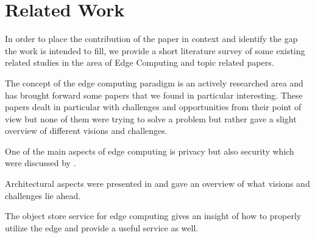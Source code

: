 \section{Related Work}\label{sec:relatedwork}

In order to place the contribution of the paper in context and identify the gap the work is intended to fill, we provide a short literature survey of some existing related studies in the area of Edge Computing and topic related papers.

The concept of the edge computing paradigm is an actively researched area and has brought forward some papers that we found in particular interesting.
These papers dealt in particular with challenges and opportunities from their point of view \cite{7488250}\cite{GarciaLopez:2015:ECV:2831347.2831354}\cite{7796149}\cite{7474412}\cite{AHMED201759} but none of them were trying to solve a problem but rather gave a slight overview of different visions and challenges.

One of the main aspects of edge computing is privacy but also security which were discussed by \cite{7474412}\cite{GarciaLopez:2015:ECV:2831347.2831354}\cite{AHMED201759}\cite{7488250}.

Architectural aspects were presented in \cite{7474412}\cite{GarciaLopez:2015:ECV:2831347.2831354}\cite{7488250} and gave an overview of what visions and challenges lie ahead.

The object store service for edge computing \cite{8014358} gives an insight of how to properly utilize the edge and provide a useful service as well. 


\\

